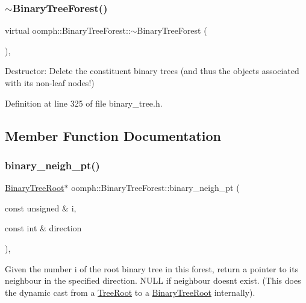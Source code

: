 \subsubsection{\texorpdfstring{$\sim$\+Binary\+Tree\+Forest()}{~BinaryTreeForest()}}
{\footnotesize\ttfamily virtual oomph\+::\+Binary\+Tree\+Forest\+::$\sim$\+Binary\+Tree\+Forest (\begin{DoxyParamCaption}{ }\end{DoxyParamCaption})\hspace{0.3cm}{\ttfamily [inline]}, {\ttfamily [virtual]}}



Destructor\+: Delete the constituent binary trees (and thus the objects associated with its non-\/leaf nodes!) 



Definition at line 325 of file binary\+\_\+tree.\+h.



\subsection{Member Function Documentation}
\mbox{\label{classoomph_1_1BinaryTreeForest_ab4b0d2442ea99b55620af7126a78f930}} 
\subsubsection{\texorpdfstring{binary\+\_\+neigh\+\_\+pt()}{binary\_neigh\_pt()}}
{\footnotesize\ttfamily \hyperlink{classoomph_1_1BinaryTreeRoot}{Binary\+Tree\+Root}$\ast$ oomph\+::\+Binary\+Tree\+Forest\+::binary\+\_\+neigh\+\_\+pt (\begin{DoxyParamCaption}\item[{const unsigned \&}]{i,  }\item[{const int \&}]{direction }\end{DoxyParamCaption})\hspace{0.3cm}{\ttfamily [inline]}, {\ttfamily [private]}}



Given the number i of the root binary tree in this forest, return a pointer to its neighbour in the specified direction. N\+U\+LL if neighbour doesn\textquotesingle{}t exist. (This does the dynamic cast from a \hyperlink{classoomph_1_1TreeRoot}{Tree\+Root} to a \hyperlink{classoomph_1_1BinaryTreeRoot}{Binary\+Tree\+Root} internally). 



